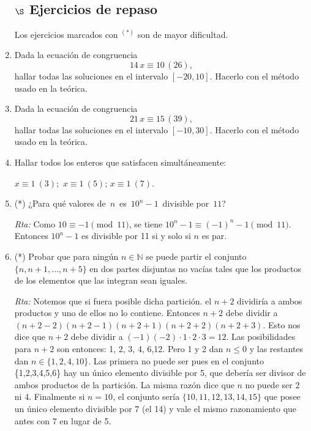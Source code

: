 \documentclass[a4paper,12pt,twoside,spanish,reqno]{amsbook}
\numberwithin{equation}{section}
\newcommand{\rta}{\noindent\textit{Rta: }}
\newcommand \N{{\mathbb N}}
\begin{document}
\begin{enumerate}
    
    \
    
    \subsection*{$\S$ Ejercicios de repaso} Los ejercicios marcados con ${}^{(*)}$ son de mayor dificultad.
    
    \item Dada la ecuación de congruencia
$$14\,x\equiv 10 \, (26),$$
hallar todas las soluciones en el intervalo $[-20,10]$. Hacerlo con el método usado en la teórica.

\item Dada la ecuación de congruencia
$$21\,x\equiv 15 \, (39),$$
hallar todas las soluciones en el intervalo $[-10,30]$. Hacerlo con el método usado en la teórica. 


\item Hallar todos los enteros que satisfacen simultáneamente:

$x \equiv 1\ ( 3); $ \qquad $x \equiv 1 \ ( 5)$; \qquad $x \equiv 1\ ( 7)$.

    
    \item (*) ¿Para qu\'e valores de \,$n$\, es \,$10^n-1$\, divisible por \,$11$?
    
    \rta Como $10\equiv -1 \pmod{11}$, se tiene $10^{n}-1\equiv(-1)^n-1 \pmod{11}$. Entonces $10^n-1$ es divisible por 11 si y solo si $n$ es par.
    
    
    
    \item (*) Probar que para ningún $n\in\N$ se puede partir el conjunto $\{n,n+1,\ldots, n+5\}$ en dos partes
    disjuntas no vacías tales que los productos de los elementos que las integran sean iguales.
    
    \rta Notemos que si fuera posible dicha partición. el $n+2$ dividiría a ambos productos y uno de ellos no lo contiene.
    Entonces $n+2$ debe dividir a $(n+2-2)(n+2-1)(n+2+1)(n+2+2)(n+2+3)$. Esto nos dice que $n+2$ debe dividir a 
    $(-1)(-2)\cdot1\cdot2\cdot3=12$. Las posibilidades para $n+2$ son entonces: 1, 2, 3, 4, 6,12.
    Pero 1 y 2 dan $n\le 0$ y las restantes dan $n\in \{1, 2, 4, 10\}$. Las primera no puede ser pues en el conjunto \{1,2,3,4,5,6\} hay un único elemento divisible por 5, que debería ser divisor de ambos productos de la partición.
    La misma razón dice que $n$ no puede ser 2 ni 4. Finalmente si $n=10$, el conjunto sería $\{10,11,12,13,14,15\}$ que posee un único elemento divisible por 7 (el 14) y vale el mismo razonamiento que antes con 7 en lugar de 5.
    

\end{enumerate}
\end{document}
